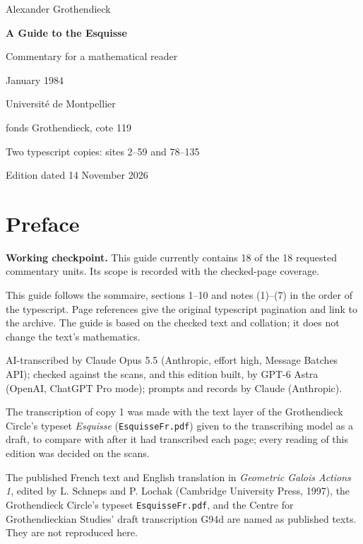 \documentclass[11pt,a4paper]{article}
\newcommand{\EditionTitle}{A Guide to the Esquisse}
\newcommand{\EditionForm}{Commentary for a mathematical reader}
\begin{document}
\begin{titlepage}
\centering
\vspace*{18mm}
{\Large Alexander Grothendieck\par}
\vspace{12mm}
{\Huge\bfseries\EditionTitle\par}
\vspace{8mm}
{\Large\EditionForm\par}
\vspace{14mm}
{\large January 1984\par}
\vfill
{\large Université de Montpellier\par fonds Grothendieck, cote 119\par}
\vspace{8mm}
{\normalsize Two typescript copies: sites 2--59 and 78--135\par}
\vspace{8mm}
{\normalsize Edition dated 14 November 2026\par}
\end{titlepage}
\thispagestyle{plain}
\section*{Preface}
\noindent\textbf{Working checkpoint.} This guide currently contains 18 of the 18 requested commentary units. Its scope is recorded with the checked-page coverage.\par\smallskip
This guide follows the sommaire, sections 1–10 and notes (1)–(7) in the order of the typescript. Page references give the original typescript pagination and link to the archive. The guide is based on the checked text and collation; it does not change the text’s mathematics.

\smallskip
AI-transcribed by Claude Opus 5.5 (Anthropic, effort high, Message Batches API); checked against the scans, and this edition built, by GPT-6 Astra (OpenAI, ChatGPT Pro mode); prompts and records by Claude (Anthropic).


The transcription of copy 1 was made with the text layer of the Grothendieck Circle's typeset \textit{Esquisse} (\texttt{EsquisseFr.pdf}) given to the transcribing model as a draft, to compare with after it had transcribed each page; every reading of this edition was decided on the scans.

The published French text and English translation in \textit{Geometric Galois Actions 1}, edited by L. Schneps and P. Lochak (Cambridge University Press, 1997), the Grothendieck Circle's typeset \texttt{EsquisseFr.pdf}, and the Centre for Grothendieckian Studies' draft transcription G94d are named as published texts. They are not reproduced here.
\end{document}
